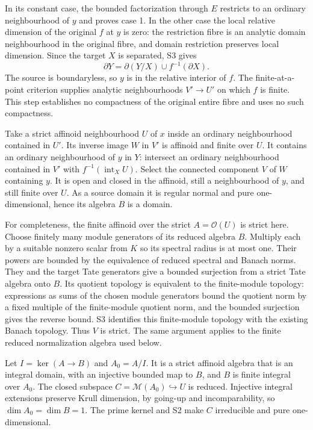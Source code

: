 \documentclass[
  11pt,
]{article}
\begin{document}
In its constant case, the bounded factorization through \(E\) restricts
to an ordinary neighbourhood of \(y\) and proves case 1. In the other
case the local relative dimension of the original \(f\) at \(y\) is
zero: the restriction fibre is an analytic domain neighbourhood in the
original fibre, and domain restriction preserves local dimension. Since
the target \(X\) is separated, S3 gives \[
                    \partial Y
                     =\partial(Y/X)\cup f^{-1}(\partial X).
\] The source is boundaryless, so \(y\) is in the relative interior of
\(f\). The finite-at-a-point criterion supplies analytic neighbourhoods
\(V'\to U'\) on which \(f\) is finite. This step establishes no
compactness of the original entire fibre and uses no such compactness.

Take a strict affinoid neighbourhood \(U\) of \(x\) inside an ordinary
neighbourhood contained in \(U'\). Its inverse image \(W\) in \(V'\) is
affinoid and finite over \(U\). It contains an ordinary neighbourhood of
\(y\) in \(Y\): intersect an ordinary neighbourhood contained in \(V'\)
with \(f^{-1}(\operatorname{int}_X U)\). Select the connected component
\(V\) of \(W\) containing \(y\). It is open and closed in the affinoid,
still a neighbourhood of \(y\), and still finite over \(U\). As a source
domain it is regular normal and pure one-dimensional, hence its algebra
\(B\) is a domain.

For completeness, the finite affinoid over the strict
\(A=\mathcal O(U)\) is strict here. Choose finitely many module
generators of its reduced algebra \(B\). Multiply each by a suitable
nonzero scalar from \(K\) so its spectral radius is at most one. Their
powers are bounded by the equivalence of reduced spectral and Banach
norms. They and the target Tate generators give a bounded surjection
from a strict Tate algebra onto \(B\). Its quotient topology is
equivalent to the finite-module topology: expressions as sums of the
chosen module generators bound the quotient norm by a fixed multiple of
the finite-module quotient norm, and the bounded surjection gives the
reverse bound. S3 identifies this finite-module topology with the
existing Banach topology. Thus \(V\) is strict. The same argument
applies to the finite reduced normalization algebra used below.

Let \(I=\ker(A\to B)\) and \(A_0=A/I\). It is a strict affinoid algebra
that is an integral domain, with an injective bounded map to \(B\), and \(B\) is finite
integral over \(A_0\). The closed subspace
\(C=\mathcal M(A_0)\hookrightarrow U\) is reduced. Injective integral
extensions preserve Krull dimension, by going-up and incomparability, so
\(\dim A_0=\dim B=1\). The prime kernel and S2 make \(C\) irreducible
and pure one-dimensional.
\end{document}

